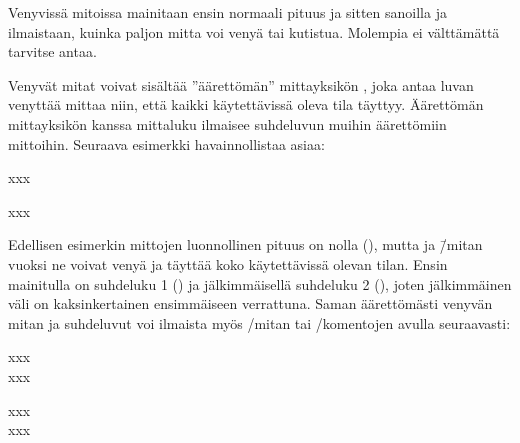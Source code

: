 \begin{koodilohkosis}
  \setlength{\parskip}{2ex plus 0.2ex minus 0.1ex}
  \setlength{\parindent}{0em}
\end{koodilohkosis}

Venyvissä mitoissa mainitaan ensin normaali pituus ja sitten sanoilla
 ja  ilmaistaan, kuinka paljon mitta voi venyä
tai kutistua. Molempia ei välttämättä tarvitse antaa.

Venyvät mitat voivat sisältää ''äärettömän'' mittayksikön ,
joka antaa luvan venyttää mittaa niin, että kaikki käytettävissä oleva
tila täyttyy. Äärettömän mittayksikön kanssa mittaluku ilmaisee
suhdeluvun muihin äärettömiin mittoihin. Seuraava esimerkki
havainnollistaa asiaa:


\begin{koodilohkosis}
  x\hspace{0mm plus 1fill}x\hspace{0mm plus 2fill}x
\end{koodilohkosis}

\begin{tulossis}
  x\hspace{0mm plus 1fill}x\hspace{0mm plus 2fill}x
\end{tulossis}

Edellisen esimerkin mittojen luonnollinen pituus on nolla (\koodi{0mm}),
mutta  ja  \=/mitan vuoksi ne voivat venyä ja
täyttää koko käytettävissä olevan tilan. Ensin mainitulla on suhdeluku 1
() ja jälkimmäisellä suhdeluku 2 (), joten
jälkimmäinen väli on kaksinkertainen ensimmäiseen verrattuna. Saman
äärettömästi venyvän mitan ja suhdeluvut voi ilmaista myös \-/mitan tai \-/komentojen avulla
seuraavasti:


\begin{koodilohkosis}
  xxx \\
  x\hfill x\hfill\hfill x
\end{koodilohkosis}

\begin{tulossis}
  xxx \\
  x\hfill x\hfill\hfill x
\end{tulossis}

